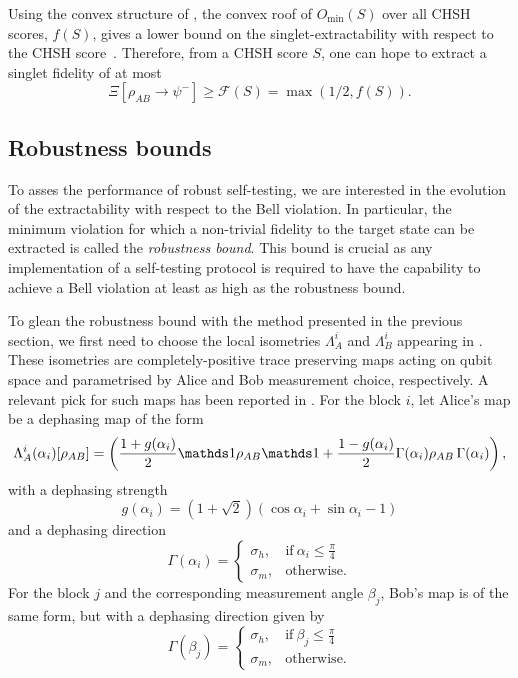 Using the convex structure of , the convex roof of $O_{\min}(S)$ over all CHSH scores, $f(S)$, gives a lower bound on the singlet-extractability with respect to the CHSH score~\cite{Sekatski2018}.
Therefore, from a CHSH score $S$, one can hope to extract a singlet fidelity of at most 
\begin{equation}
	\Xi [\rho_{AB} \rightarrow \psi^{-}] \geq \mathcal{F}(S)=\max\left(1/2, f(S)\right).
\end{equation}

\subsection{Robustness bounds}

To asses the performance of robust self-testing, we are interested in the evolution of the extractability with respect to the Bell violation.
In particular, the minimum violation for which a non-trivial fidelity to the target state can be extracted is called the \textit{robustness bound}.
This bound is crucial as any implementation of a self-testing protocol is required to have the capability to achieve a Bell violation at least as high as the robustness bound.

To glean the robustness bound with the method presented in the previous section, we first need to choose the local isometries $\Lambda_A^i$ and $\Lambda_B^i$ appearing in .
These isometries are completely-positive trace preserving maps acting on qubit space and parametrised by Alice and Bob measurement choice, respectively.
A relevant pick for such maps has been reported in \cite{Kaniewski2016}.
For the block $i$, let Alice's map be a dephasing map of the form
\begin{equation}
	\Lambda_A^i(\alpha_i)[\rho_{AB}] = \left( \frac{1+g(\alpha_i)}{2}\id\rho_{AB}\id+\frac{1-g(\alpha_i)}{2}\Gamma(\alpha_i)\rho_{AB}\,\Gamma(\alpha_i)\right),
	\label{eq:dephasing_maps}
\end{equation}
with a dephasing strength
\begin{equation}
	g(\alpha_i)=(1+\sqrt{2})(\cos{\alpha_i}+\sin{\alpha_i}-1)
	\label{eq:dephasing_strength}
\end{equation}
and a dephasing direction
\begin{equation}
	\Gamma(\alpha_i) = \begin{cases}
      \sigma_h, & \text{if}\ \alpha_i\leq\frac{\pi}{4} \\
      \sigma_m, & \text{otherwise}.
    \end{cases}
	\label{eq:dephasing_direction_alice}
\end{equation}
For the block $j$ and the corresponding measurement angle $\beta_j$, Bob's map is of the same form, but with a dephasing direction given by
\begin{equation}
	\Gamma(\beta_j) = \begin{cases}
      \sigma_h, & \text{if}\ \beta_j\leq\frac{\pi}{4} \\
      \sigma_m, & \text{otherwise}.
    \end{cases}
	\label{eq:dephasing_direction_bob}
\end{equation}

